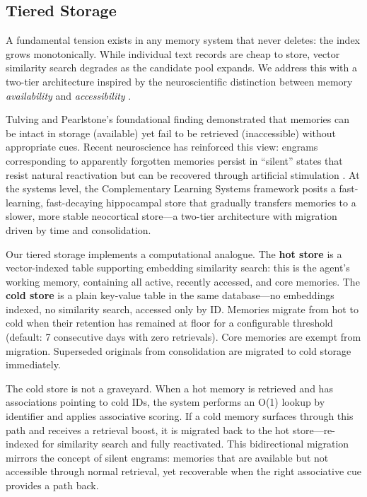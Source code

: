 \documentclass[11pt,a4paper]{article}
\begin{document}
\subsection{Tiered Storage}
\label{sec:tiered}

A fundamental tension exists in any memory system that never deletes: the index grows monotonically. While individual text records are cheap to store, vector similarity search degrades as the candidate pool expands. We address this with a two-tier architecture inspired by the neuroscientific distinction between memory \emph{availability} and \emph{accessibility} \citep{tulving1966availability}.

Tulving and Pearlstone's foundational finding demonstrated that memories can be intact in storage (available) yet fail to be retrieved (inaccessible) without appropriate cues. Recent neuroscience has reinforced this view: engrams corresponding to apparently forgotten memories persist in ``silent'' states that resist natural reactivation but can be recovered through artificial stimulation \citep{ryan2022forgetting, guskjolen2024forgetting}. At the systems level, the Complementary Learning Systems framework \citep{mcclelland1995complementary} posits a fast-learning, fast-decaying hippocampal store that gradually transfers memories to a slower, more stable neocortical store---a two-tier architecture with migration driven by time and consolidation.

Our tiered storage implements a computational analogue. The \textbf{hot store} is a vector-indexed table supporting embedding similarity search: this is the agent's working memory, containing all active, recently accessed, and core memories. The \textbf{cold store} is a plain key-value table in the same database---no embeddings indexed, no similarity search, accessed only by ID. Memories migrate from hot to cold when their retention has remained at floor for a configurable threshold (default: 7 consecutive days with zero retrievals). Core memories are exempt from migration. Superseded originals from consolidation are migrated to cold storage immediately.

The cold store is not a graveyard. When a hot memory is retrieved and has associations pointing to cold IDs, the system performs an O(1) lookup by identifier and applies associative scoring. If a cold memory surfaces through this path and receives a retrieval boost, it is migrated back to the hot store---re-indexed for similarity search and fully reactivated. This bidirectional migration mirrors the concept of silent engrams: memories that are available but not accessible through normal retrieval, yet recoverable when the right associative cue provides a path back.
\end{document}
